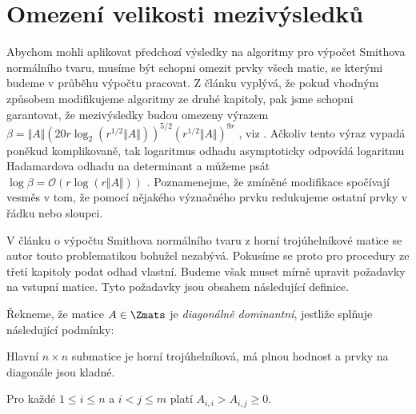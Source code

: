 \section{Omezení velikosti mezivýsledků}
Abychom mohli aplikovat předchozí výsledky na algoritmy pro výpočet Smithova
normálního tvaru, musíme být schopni omezit prvky všech matic, se kterými
budeme v průběhu výpočtu pracovat. Z článku \cite{triang} vyplývá, že pokud
vhodným způsobem modifikujeme algoritmy ze druhé kapitoly, pak jsme schopni
garantovat, že mezivýsledky budou omezeny výrazem
$ \beta = \Vert A \Vert (20 r \log_2{ (r^{1/2} \Vert A \Vert) })^{5/2} (r^{1/2} \Vert A \Vert)^{9 r} $
, viz \cite[Theorem 16]{triang}.
Ačkoliv tento výraz vypadá poněkud komplikovaně, tak logaritmus odhadu
asymptoticky odpovídá logaritmu Hadamardova odhadu na determinant a můžeme psát
$ \log{\beta} = \mathcal{O}(r \log{(r \Vert A \Vert)}) $ \cite[Theorem 16]{triang}.
Poznamenejme, že zmíněné modifikace spočívají vesměs v tom, že pomocí nějakého
význačného prvku redukujeme ostatní prvky v řádku nebo sloupci.

V článku \cite{SNF_Arne} o výpočtu Smithova normálního tvaru z horní trojúhelníkové
matice se autor touto problematikou bohužel nezabývá. Pokusíme
se proto pro procedury ze třetí kapitoly podat odhad vlastní. Budeme však muset
mírně upravit požadavky na vstupní matice. Tyto požadavky jsou obsahem následující
definice.

\begin{defi}
    Řekneme, že matice $ A \in \Zmats $ je \emph{diagonálně dominantní}, jestliže
    splňuje následující podmínky:
    \begin{Cond}
        \item Hlavní $ n \times n $ submatice je horní trojúhelníková, má plnou
            hodnost a prvky na diagonále jsou kladné.
        \item Pro každé $ 1 \leq i \leq n $ a $ i < j \leq m $ platí 
            $ A_{i, i} > A_{i, j} \geq 0 $.
    \end{Cond}
\end{defi}

